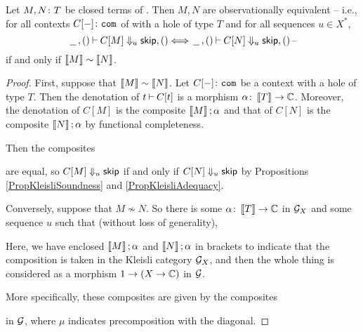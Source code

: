 \documentclass[11pt]{report}
\begin{document}
\begin{theorem}
  Let $M,N\colon T$ be closed terms of \IAX.  
  Then $M,N$ are observationally equivalent -- i.e., for all contexts $C[-]\colon{\mathtt{com}}$ of \IAX with a hole of type $T$ and for all sequences $u\in X^*$, 
  \[
    \,\underline{\hspace{1.5ex}}\,,()\mathbin{\vdash} C[M] \Downarrow_u {\mathsf{skip}},() \Longleftrightarrow \,\underline{\hspace{1.5ex}}\,,()\mathbin{\vdash} C[N] \Downarrow_u {\mathsf{skip}},()\,\text{--}
    \]
  if and only if $\left\llbracket M\right\rrbracket\sim\left\llbracket N\right\rrbracket$.
  \label{TheKleisliFullAbstraction}
\end{theorem}
\begin{proof}
  First, suppose that $\left\llbracket M\right\rrbracket\sim\left\llbracket N\right\rrbracket$.  
  Let $C[-]\colon{\mathtt{com}}$ be a context with a hole of type $T$.  
  Then the denotation of $t\mathbin{\vdash} C[t]$ is a morphism $\alpha\colon \left\llbracket T\right\rrbracket \to \mathbb{C}$.
  Moreover, the denotation of $C[M]$ is the composite $\left\llbracket M\right\rrbracket;\alpha$ and that of $C[N]$ is the composite $\left\llbracket N\right\rrbracket;\alpha$ by functional completeness.

  Then the composites
  are equal, so $C[M]\Downarrow_u{\mathsf{skip}}$ if and only if $C[N]\Downarrow_u{\mathsf{skip}}$ by Propositions \ref{PropKleisliSoundness} and \ref{PropKleisliAdequacy}.

  Conversely, suppose that $M\not\sim N$.  
  So there is some $\alpha\colon \left\llbracket T\right\rrbracket \to \mathbb{C}$ in $\mathcal G_X$ and some sequence $u$ such that (without loss of generality),
  Here, we have enclosed $\left\llbracket M\right\rrbracket;\alpha$ and $\left\llbracket N\right\rrbracket;\alpha$ in brackets to indicate that the composition is taken in the Kleisli category $\mathcal G_X$, and then the whole thing is considered as a morphism $1 \to (X \to \mathbb{C})$ in $\mathcal G$.

  More specifically, these composites are given by the composites
  in $\mathcal G$, where $\mu$ indicates precomposition with the diagonal.


\end{proof}
\end{document}
